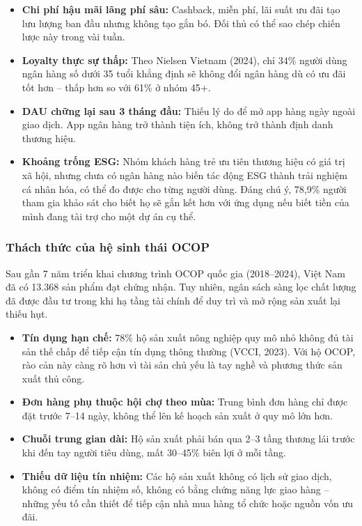 \documentclass[13pt,a4paper]{extarticle}
\begin{document}
\begin{itemize}
    \item \textbf{Chi phí hậu mãi lãng phí sâu:} Cashback, miễn phí, lãi suất ưu đãi tạo lưu lượng ban đầu nhưng không tạo gắn bó. Đối thủ có thể sao chép chiến lược này trong vài tuần.

    \item \textbf{Loyalty thực sự thấp:} Theo Nielsen Vietnam (2024), chỉ 34\% người dùng ngân hàng số dưới 35 tuổi khẳng định sẽ không đổi ngân hàng dù có ưu đãi tốt hơn -- thấp hơn so với 61\% ở nhóm 45+.

    \item \textbf{DAU chững lại sau 3 tháng đầu:} Thiếu lý do để mở app hàng ngày ngoài giao dịch. App ngân hàng trở thành tiện ích, không trở thành định danh thương hiệu.

    \item \textbf{Khoảng trống ESG:} Nhóm khách hàng trẻ ưu tiên thương hiệu có giá trị xã hội, nhưng chưa có ngân hàng nào biến tác động ESG thành trải nghiệm cá nhân hóa, có thể đo được cho từng người dùng. Đáng chú ý, 78,9\% người tham gia khảo sát cho biết họ sẽ gắn kết hơn với ứng dụng nếu biết tiền của mình đang tài trợ cho một dự án cụ thể.
\end{itemize}

\subsubsection{Thách thức của hệ sinh thái OCOP}

Sau gần 7 năm triển khai chương trình OCOP quốc gia (2018--2024), Việt Nam đã có 13.368 sản phẩm đạt chứng nhận. Tuy nhiên, ngân sách sàng lọc chất lượng đã được đầu tư trong khi hạ tầng tài chính để duy trì và mở rộng sản xuất lại thiếu hụt.

\begin{itemize}
    \item \textbf{Tín dụng hạn chế:} 78\% hộ sản xuất nông nghiệp quy mô nhỏ không đủ tài sản thế chấp để tiếp cận tín dụng thông thường (VCCI, 2023). Với hộ OCOP, rào cản này càng rõ hơn vì tài sản chủ yếu là tay nghề và phương thức sản xuất thủ công.

    \item \textbf{Đơn hàng phụ thuộc hội chợ theo mùa:} Trung bình đơn hàng chỉ được đặt trước 7--14 ngày, không thể lên kế hoạch sản xuất ở quy mô lớn hơn.

    \item \textbf{Chuỗi trung gian dài:} Hộ sản xuất phải bán qua 2--3 tầng thương lái trước khi đến tay người tiêu dùng, mất 30--45\% biên lợi ở mỗi tầng.

    \item \textbf{Thiếu dữ liệu tín nhiệm:} Các hộ sản xuất không có lịch sử giao dịch, không có điểm tín nhiệm số, không có bằng chứng năng lực giao hàng -- những yếu tố cần thiết để tiếp cận nhà mua hàng tổ chức hoặc nguồn vốn ưu đãi.
\end{itemize}
\end{document}
